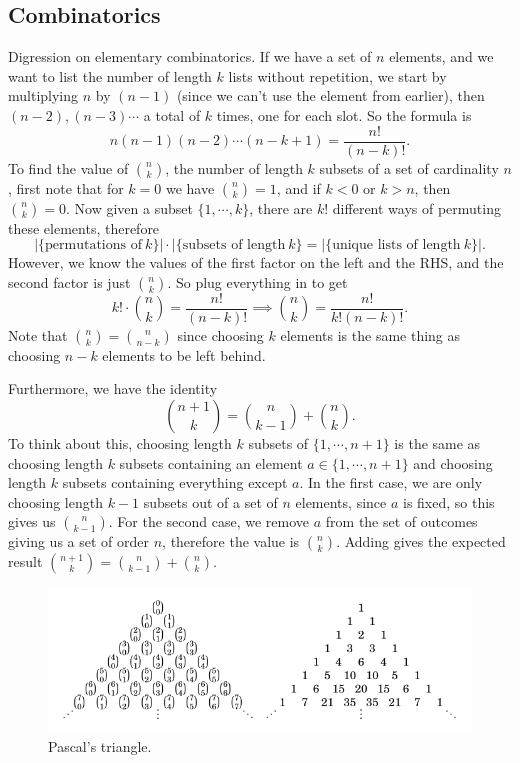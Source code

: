 \subsection{Combinatorics}

Digression on elementary combinatorics. If we have a set of $n$ elements, and we want to list the number of length $k$ lists without repetition, we start by multiplying $n$ by $(n-1)$ (since we can't use the element from earlier), then $(n-2),(n-3)\cdots $ a total of $k$ times, one for each slot. So the formula is \[
    n(n-1)(n-2)\cdots (n-k+1)= \frac{n!}{(n-k)!}.
\] To find the value of ${n \choose k} $, the number of length $k$ subsets of a set of cardinality $n$, first note that for $k=0$ we have ${n \choose k} =1$, and if $k<0$ or $k>n$, then ${n \choose k} =0 $. Now given a subset $ \{1,\cdots ,k\} $, there are $k!$ different ways of permuting these elements, therefore \[
| \{\text{permutations of} \ k\} | \cdot | \{ \text{subsets of length} \ k \} = | \{ \text{unique lists of length} \ k\}|. 
\] However, we know the values of the first factor on the left and the RHS, and the second factor is just ${n\choose k} $. So plug everything in to get  \[
k! \cdot {n \choose k} = \frac{n!}{(n-k)!} \implies {n \choose k} = \frac{n!}{k!(n-k)!}.
\] Note that ${n \choose k} ={n \choose n-k} $ since choosing $k$ elements is the same thing as choosing $n-k$ elements to be left behind. 

Furthermore, we have the identity 
\[
{n+1 \choose k} = {n \choose k-1} +{n \choose k}.
\] 
 To think about this, choosing length $k$ subsets of $\{1,\cdots ,n+1\} $ is the same as choosing length $k$ subsets containing an element $a \in \{1,\cdots ,n+1\} $ and choosing length $k$ subsets containing everything except $a$. In the first case, we are only choosing length $k-1$ subsets out of a set of $n$ elements, since $a$ is fixed, so this gives us ${n \choose k-1} $. For the second case, we remove $a$ from the set of outcomes giving us a set of order $n$, therefore the value is ${n\choose k} $. Adding gives the expected result ${n+1 \choose k} ={n \choose k-1} +{n \choose k} $. 

 \begin{figure}[h]
\centering
\includegraphics[width=0.7\linewidth]{figures/pascals_triangle.png}
\caption{Pascal's triangle.}
\label{pascal}
\end{figure}

